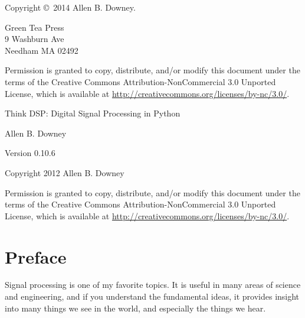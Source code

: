 \documentclass[12pt]{book}
\newcommand{\thetitle}{Think DSP: Digital Signal Processing in Python}
\newcommand{\theversion}{0.10.6}
\begin{document}
\begin{latexonly}
\pagebreak
\thispagestyle{empty}

Copyright \copyright ~2014 Allen B. Downey.


\vspace{0.2in}

\begin{flushleft}
Green Tea Press       \\
9 Washburn Ave \\
Needham MA 02492
\end{flushleft}

Permission is granted to copy, distribute, and/or modify this document
under the terms of the Creative Commons Attribution-NonCommercial 3.0 Unported
License, which is available at \url{http://creativecommons.org/licenses/by-nc/3.0/}.

\vspace{0.2in}

\end{latexonly}



\begin{htmlonly}


{\Large \thetitle}

{\large Allen B. Downey}

Version \theversion

\vspace{0.25in}

Copyright 2012 Allen B. Downey

\vspace{0.25in}

Permission is granted to copy, distribute, and/or modify this document
under the terms of the Creative Commons Attribution-NonCommercial 3.0
Unported License, which is available at
\url{http://creativecommons.org/licenses/by-nc/3.0/}.

\setcounter{chapter}{-1}

\end{htmlonly}

\fi

\chapter{Preface}
\label{preface}

Signal processing is one of my favorite topics.  It is useful
in many areas of science and engineering, and if you understand
the fundamental ideas, it provides insight into many things
we see in the world, and especially the things we hear.
\end{document}
